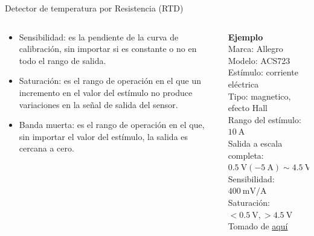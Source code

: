 \documentclass[aspectratio=169]{beamer}
\begin{document}
\begin{frame}{Detector de temperatura por Resistencia (RTD)}
    \begin{columns}[c, onlytextwidth]
        \begin{column}{0.60\textwidth}
            \begin{itemize}
                \item Sensibilidad: es la pendiente de la curva de calibración, sin importar si es constante o no en todo el rango de salida.  
                \item Saturación: es el rango de operación en el que un incremento en el valor del estímulo no produce variaciones en la señal de salida del sensor. 
                \item Banda muerta: es el rango de operación en el que, sin importar el valor del estímulo, la salida es cercana a cero.
            \end{itemize}
        \end{column}
        \begin{column}{0.35\textwidth}
            \textbf{Ejemplo}\\[4pt]
            Marca: Allegro\\[4pt]
            Modelo: ACS723\\[4pt]
            Estímulo: corriente eléctrica\\[4pt]
            Tipo: magnetico, efecto Hall\\[4pt]
            Rango del estímulo: $\SI{10}{\ampere}$\\[4pt]
            Salida a escala completa: $\SI{0.5}{\volt}(\SI{-5}{\ampere}) \sim \SI{4.5}{\volt}(\SI{5}{\ampere})$\\[4pt]
            Sensibilidad: $\SI{400}{\milli\volt/\ampere}$ \\[4pt]
            Saturación: $<\SI{0.5}{\volt}, >\SI{4.5}{\volt}$\\[10pt]
            \tiny{Tomado de \href{https://www.allegromicro.com/-/media/files/datasheets/acs723-datasheet.ashx}{aquí}}
        \end{column}
    \end{columns}
\end{frame}
\end{document}
